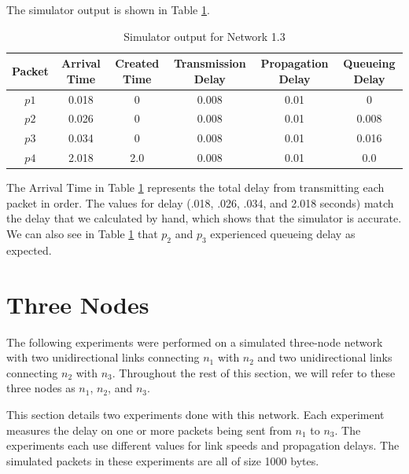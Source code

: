 \documentclass[11pt]{article}
\begin{document}
\begin{description}
\medskip

The simulator output is shown in Table \ref{tbl1.3}.

\smallskip

\begin{table}[H]
\begin{center}
\caption{Simulator output for Network 1.3}
\label{tbl1.3}
\begin{tabular}{cccccc}
  \toprule
  Packet & Arrival Time & Created Time & Transmission Delay & Propagation Delay & Queueing Delay\\
  \midrule
  $p1$ & 0.018 & 0 & 0.008 & 0.01 & 0\\
  $p2$ & 0.026 & 0 & 0.008 & 0.01 & 0.008\\
  $p3$ & 0.034 & 0 & 0.008 & 0.01 & 0.016\\
  $p4$ & 2.018 & 2.0 & 0.008 & 0.01 & 0.0\\
  \bottomrule
\end{tabular}
\end{center}
\end{table}

\smallskip

The Arrival Time in Table \ref{tbl1.3} represents the total delay from transmitting each packet in order. The values for delay (.018, .026, .034, and 2.018 seconds) match the delay that we calculated by hand, which shows that the simulator is accurate. We can also see in Table \ref{tbl1.3} that $p_2$ and $p_3$ experienced queueing delay as expected.

\end{description}

\section{Three Nodes}

The following experiments were performed on a simulated three-node network with two unidirectional links connecting $n_1$ with $n_2$ and two unidirectional links connecting $n_2$ with $n_3$. Throughout the rest of this section, we will refer to these three nodes as $n_1$, $n_2$, and $n_3$.

This section details two experiments done with this network. Each experiment measures the delay on one or more packets being sent from $n_1$ to $n_3$. The experiments each use different values for link speeds and propagation delays. The simulated packets in these experiments are all of size 1000 bytes.
\end{document}
